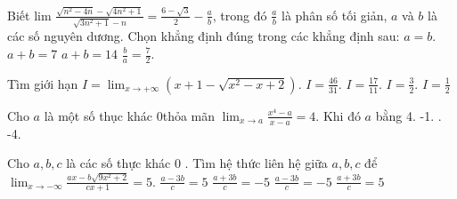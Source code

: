 \begin{ex}%
	Biết lim $\frac{\sqrt{n^2-4 n}-\sqrt{4 n^2+1}}{\sqrt{3 n^2+1}-n}=\frac{6-\sqrt{3}}{2}-\frac{a}{b}$, trong đó $\frac{a}{b}$ là phân số tối giản, $a$ và $b$ là các số nguyên dương. Chọn khẳng định đúng trong các khẳng định sau:
\choice
{ $a=b$.}
{ $a+b=7$}
{\True $a+b=14$}
{$\frac{b}{a}=\frac{7}{2}$.}
\end{ex}
\begin{ex}%
	Tìm giới hạn $I=\lim _{x \rightarrow+\infty}\left(x+1-\sqrt{x^2-x+2}\right)$.
\choice
{$I=\frac{46}{31}$.}
{$I=\frac{17}{11}$.}
{\True $I=\frac{3}{2}$.}
{$I=\frac{1}{2}$}
\end{ex}
\begin{ex}%
	Cho $a$ là một số thục khác 0thỏa mãn $\lim _{x \rightarrow a} \frac{x^4-a}{x-a}=4$.
	Khi đó $a$ bằng
\choice
{4.}
{-1.}
{.}
{-4.}
\end{ex}
\begin{ex}%
	Cho $a, b, c$ là các số thực khác 0 . Tìm hệ thức liên hệ giữa $a, b, c$ để $\lim _{x \rightarrow-\infty} \frac{a x-b \sqrt{9 x^2+2}}{c x+1}=5$.
\choice
{$\frac{a-3 b}{c}=5$}
{$\frac{a+3 b}{c}=-5$}
{$\frac{a-3 b}{c}=-5$}
{\True $\frac{a+3 b}{c}=5$}
\end{ex}
